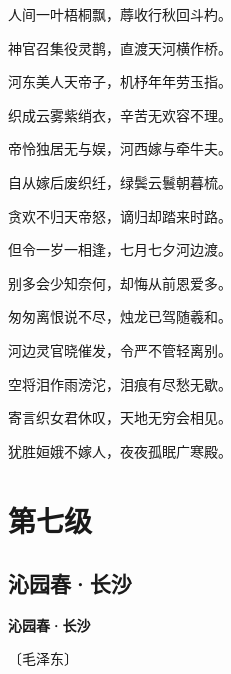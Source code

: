\documentclass[12pt,UTF-8,openany,fontset=none]{ctexbook}
\begin{document}
\begin{center}
    \begin{Large}

        人间一叶梧桐飘，蓐收行秋回斗杓。

        神官召集役灵鹊，直渡天河横作桥。

        河东美人天帝子，机杼年年劳玉指。

        织成云雾紫绡衣，辛苦无欢容不理。

        帝怜独居无与娱，河西嫁与牵牛夫。

        自从嫁后废织纴，绿鬓云鬟朝暮梳。

        贪欢不归天帝怒，谪归却踏来时路。

        但令一岁一相逢，七月七夕河边渡。

        别多会少知奈何，却悔从前恩爱多。

        匆匆离恨说不尽，烛龙已驾随羲和。

        河边灵官晓催发，令严不管轻离别。

        空将泪作雨滂沱，泪痕有尽愁无歇。

        寄言织女君休叹，天地无穷会相见。

        犹胜姮娥不嫁人，夜夜孤眠广寒殿。

    \end{Large}

\end{center}

\vspace{8pt}
\clearpage


\chapter{第七级}
\clearpage

\section{沁园春·长沙}


\begin{center}
    {\bfseries 沁园春·长沙}

    \vspace{18pt}

    \begin{large}\xuwen
        〔毛泽东〕
    \end{large}

\end{center}
\end{document}
